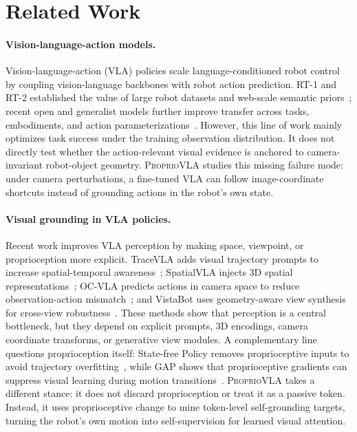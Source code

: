 \section{Related Work}

\paragraph{Vision-language-action models.}
Vision-language-action (VLA) policies scale language-conditioned robot control
by coupling vision-language backbones with robot action prediction. RT-1 and
RT-2 established the value of large robot datasets and web-scale semantic
priors~\citep{brohan2022rt1,brohan2023rt2}; recent open and generalist models
further improve transfer across tasks, embodiments, and action
parameterizations~\citep{team2024octo,kim2024openvla,black2024pi0}.
However, this line of work mainly optimizes task success under the training
observation distribution. It does not directly test whether the action-relevant
visual evidence is anchored to camera-invariant robot-object geometry.
\textsc{ProprioVLA} studies this missing failure mode: under camera
perturbations, a fine-tuned VLA can follow image-coordinate shortcuts instead
of grounding actions in the robot's own state.

\paragraph{Visual grounding in VLA policies.}
Recent work improves VLA perception by making space, viewpoint, or
proprioception more explicit. TraceVLA adds visual trajectory prompts to
increase spatial-temporal awareness~\citep{zheng2025tracevla}; SpatialVLA
injects 3D spatial representations~\citep{qu2025spatialvla}; OC-VLA predicts
actions in camera space to reduce observation-action mismatch~\citep{zhang2025ocvla};
and VistaBot uses geometry-aware view synthesis for cross-view
robustness~\citep{gu2026vistabot}. These methods show that perception is a
central bottleneck, but they depend on explicit prompts, 3D encodings, camera
coordinate transforms, or generative view modules. A complementary line
questions proprioception itself: State-free Policy removes proprioceptive
inputs to avoid trajectory overfitting~\citep{zhao2025statefree}, while GAP
shows that proprioceptive gradients can suppress visual learning during motion
transitions~\citep{lu2026gap}. \textsc{ProprioVLA} takes a different stance: it
does not discard proprioception or treat it as a passive token. Instead, it
uses proprioceptive change to mine token-level self-grounding targets, turning
the robot's own motion into self-supervision for learned visual attention.
